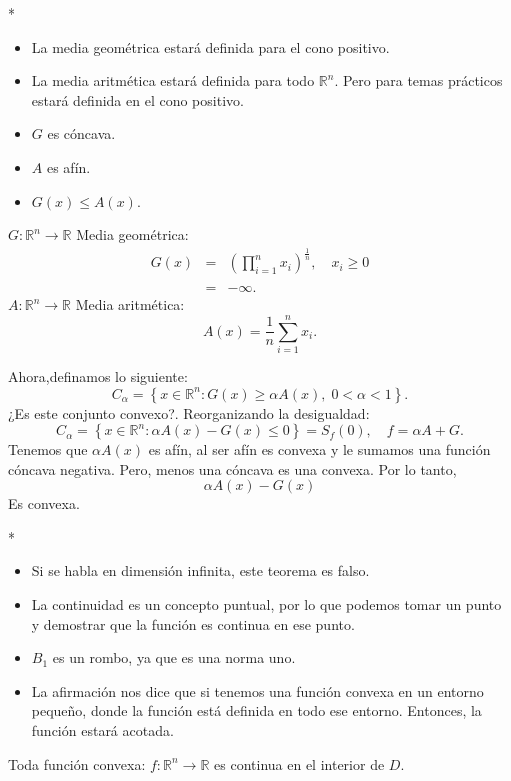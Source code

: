 \begin{paracol}{2}
\switchcolumn[1]*{\noindent\scriptsize
    \begin{itemize}
	\item La media geométrica estará definida para el cono positivo.
	\item La media aritmética estará definida para todo $\mathbb{R}^n$. Pero para temas prácticos estará definida en el cono positivo.
	\item $G$ es cóncava.
	\item $A$ es afín.
	\item $G(x)\leq A(x)$.
    \end{itemize}
}
\switchcolumn[0]\noindent
\begin{ejem} $G:\mathbb{R}^n\to \mathbb{R}$
    Media geométrica:
    $$
    \begin{array}{rcl}
	G(x)&=&\left(\prod_{i=1}^n x_i\right)^{\frac{1}{n}},\quad x_i\geq 0\\\\
	    &=&-\infty.
    \end{array}
    $$
    $A:\mathbb{R}^n\to \mathbb{R}$
    Media aritmética:
    $$A(x)=\frac{1}{n}\sum_{i=1}^n x_i.$$
\end{ejem}

Ahora,definamos lo siguiente:
$$C_\alpha = \left\{x\in \mathbb{R}^n: G(x)\geq \alpha A(x),\; 0<\alpha<1\right\}.$$
¿Es este conjunto convexo?. Reorganizando la desigualdad:
$$C_\alpha = \left\{x\in \mathbb{R}^n:  \alpha A(x)-G(x)\leq 0\right\}=S_f(0),\quad f=\alpha A+G.$$
Tenemos que $\alpha A(x)$ es afín, al ser afín es convexa y le sumamos una función cóncava negativa. Pero, menos una cóncava es una convexa. Por lo tanto,  
$$\alpha A(x)-G(x)$$
Es convexa. 

\switchcolumn[1]*{\noindent\scriptsize
	\begin{itemize}
	    \item Si se habla en dimensión infinita, este teorema es falso.
	    \item La continuidad es un concepto puntual, por lo que podemos tomar un punto y demostrar que la función es continua en ese punto.
	    \item $B_1$ es un rombo, ya que es una norma uno.
	    \item La afirmación nos dice que si tenemos una función convexa en un entorno pequeño, donde la función está definida en todo ese entorno. Entonces, la función estará acotada.
	\end{itemize}
}
\switchcolumn[0]\noindent
\begin{teo} Toda función convexa: $f:\mathbb{R}^n\to \mathbb{R}$ es continua en el interior de $D$.


\end{teo}
\end{paracol}
